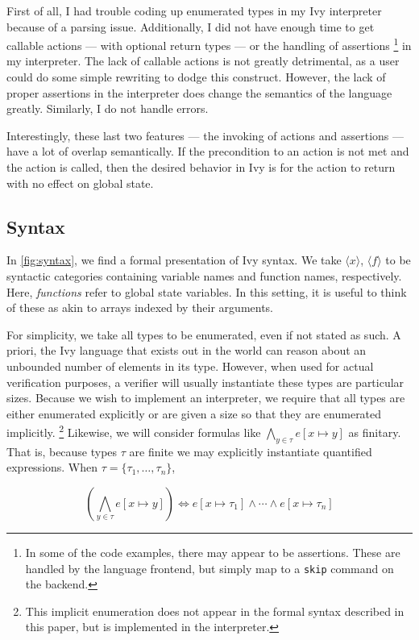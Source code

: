 \documentclass{article}
\begin{document}
\begin{multicols}{2}
    First of all, I had trouble coding up enumerated types in my Ivy interpreter because of a parsing issue. Additionally, I did not have enough time to get callable actions --- with optional return types --- or the handling of assertions \footnote{In some of the code examples, there may appear to be assertions. These are handled by the language frontend, but simply map to a \texttt{skip} command on the backend.} in my interpreter. The lack of callable actions is not greatly detrimental, as a user could do some simple rewriting to dodge this construct. However, the lack of proper assertions in the interpreter does change the semantics of the language greatly. Similarly, I do not handle errors.

    Interestingly, these last two features --- the invoking of actions and assertions --- have a lot of overlap semantically. If the precondition to an action is not met and the action is called, then the desired behavior in Ivy is for the action to return with no effect on global state.

    \subsection{Syntax}

    In \cref{fig:syntax}, we find a formal presentation of Ivy syntax. We take $\langle x \rangle$, $\langle f \rangle$ to be syntactic categories containing variable names and function names, respectively. Here, \textit{functions} refer to global state variables. In this setting, it is useful to think of these as akin to arrays indexed by their arguments.

    For simplicity, we take all types to be enumerated, even if not stated as such. A priori, the Ivy language that exists out in the world can reason about an unbounded number of elements in its type. However, when used for actual verification purposes, a verifier will usually instantiate these types are particular sizes. Because we wish to implement an interpreter, we require that all types are either enumerated explicitly or are given a size so that they are enumerated implicitly. \footnote{This implicit enumeration does not appear in the formal syntax described in this paper, but is implemented in the interpreter.} Likewise, we will consider formulas like $\bigwedge_{y \in \tau} e[x \mapsto y]$ as finitary. That is, because types $\tau$ are finite we may explicitly instantiate quantified expressions. When $\tau = \{\tau_1, \dots, \tau_n \}$,

    \[
        \left( \bigwedge_{y \in \tau} e[x \mapsto y] \right) \Leftrightarrow e[x \mapsto \tau_1] \land \cdots \land e[x \mapsto \tau_n]
    \]


\end{multicols}
\end{document}
